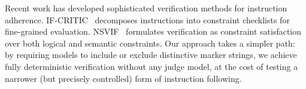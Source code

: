  Recent work has developed sophisticated verification methods for instruction adherence. IF-CRITIC~\cite{wen2025ifcritic} decomposes instructions into constraint checklists for fine-grained evaluation. NSVIF~\cite{su2026nsvif} formulates verification as constraint satisfaction over both logical and semantic constraints. Our approach takes a simpler path: by requiring models to include or exclude distinctive marker strings, we achieve fully deterministic verification without any judge model, at the cost of testing a narrower (but precisely controlled) form of instruction following.
